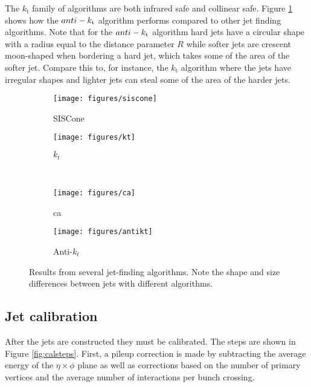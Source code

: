 The $k_{\mathrm{t}}$ family of algorithms are both infrared safe and collinear safe.  Figure \ref{fig:ktalgos} shows how the $anti-k_{\rm{t}}$ algorithm performs compared to other jet finding algorithms.  Note that for the $anti-k_{\rm{t}}$ algorithm hard jets have a circular shape with a radius equal to the distance parameter $R$ while softer jets are crescent moon-shaped when bordering a hard jet, which takes some of the area of the softer jet.  Compare this to, for instance, the $k_{\mathrm{t}}$ algorithm where the jets have irregular shapes and lighter jets can steal some of the area of the harder jets. \\

\begin{figure}[h]
	\centering
	\begin{subfigure}[b]{0.45\textwidth}
		\texttt{[image: figures/siscone]}
		\caption{SISCone}
	\end{subfigure}
	\begin{subfigure}[b]{0.45\textwidth}
		\texttt{[image: figures/kt]}
		\caption{$k_t$}
	\end{subfigure}
	\\
	\begin{subfigure}[b]{0.45\textwidth}
		\texttt{[image: figures/ca]}
		\caption{\acrlong{ca}}
	\end{subfigure}
	\begin{subfigure}[b]{0.45\textwidth}
		\texttt{[image: figures/antikt]}
		\caption{Anti-$k_t$}
	\end{subfigure}
	\caption{Results from several jet-finding algorithms\cite{antikt}.  Note the shape and size differences between jets with different algorithms.} 
	\label{fig:ktalgos}
\end{figure}

\subsection{Jet calibration}

After the jets are constructed they must be calibrated.  The steps are shown in Figure \ref{fig:calsteps}.  First, a pileup correction is made by subtracting the average energy of the $\eta \times \phi$ plane as well as corrections based on the number of primary vertices and the average number of interactions per bunch crossing. \\

